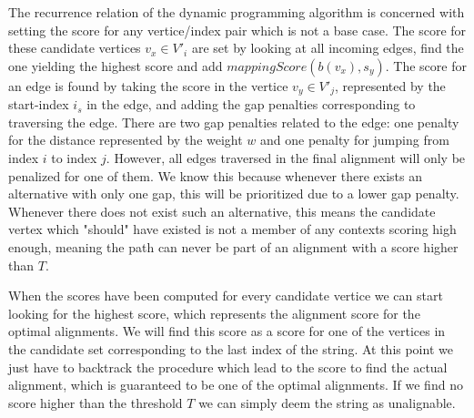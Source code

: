 \documentclass[thesis.tex]{subfiles}
\begin{document}
\par\noindent
The recurrence relation of the dynamic programming algorithm is concerned with setting the score for any vertice/index pair which is not a base case. The score for these candidate vertices $v_x \in V'_i$ are set by looking at all incoming edges, find the one yielding the highest score and add $mappingScore(b(v_x), s_y)$. The score for an edge is found by taking the score in the vertice $v_y \in V'_j$, represented by the start-index $i_s$ in the edge, and adding the gap penalties corresponding to traversing the edge. There are two gap penalties related to the edge: one penalty for the distance represented by the weight $w$ and one penalty for jumping from index $i$ to index $j$. However, all edges traversed in the final alignment will only be penalized for one of them. We know this because whenever there exists an alternative with only one gap, this will be prioritized due to a lower gap penalty. Whenever there does not exist such an alternative, this means the candidate vertex which "should" have existed is not a member of any contexts scoring high enough, meaning the path can never be part of an alignment with a score higher than $T$.\\
\par\noindent
When the scores have been computed for every candidate vertice we can start looking for the highest score, which represents the alignment score for the optimal alignments. We will find this score as a score for one of the vertices in the candidate set corresponding to the last index of the string. At this point we just have to backtrack the procedure which lead to the score to find the actual alignment, which is guaranteed to be one of the optimal alignments. If we find no score higher than the threshold $T$ we can simply deem the string as unalignable.
\end{document}
